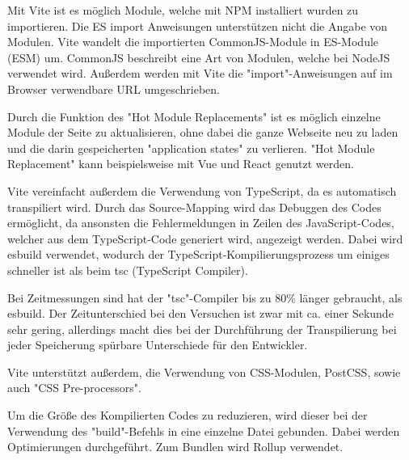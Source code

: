 

Mit Vite ist es möglich Module, welche mit NPM installiert wurden zu importieren. Die ES import Anweisungen unterstützen nicht die Angabe von Modulen. Vite wandelt die importierten CommonJS-Module in ES-Module (ESM) um. CommonJS beschreibt eine Art von Modulen, welche bei NodeJS verwendet wird. Außerdem werden mit Vite die "import"-Anweisungen auf im Browser verwendbare URL umgeschrieben. \cite{ViteFeatures}



Durch die Funktion des "Hot Module Replacements" ist es möglich einzelne Module der Seite zu aktualisieren, ohne dabei die ganze Webseite neu zu laden und die darin gespeicherten "application states" zu verlieren. "Hot Module Replacement" kann beispielsweise mit Vue und React genutzt werden. \cite{ViteFeatures}
  

Vite vereinfacht außerdem die Verwendung von TypeScript, da es automatisch transpiliert wird. 
Durch das Source-Mapping wird das Debuggen des Codes ermöglicht, da ansonsten die Fehlermeldungen in Zeilen des JavaScript-Codes, welcher aus dem TypeScript-Code generiert wird, angezeigt werden. 
Dabei wird esbuild\cite{esbuild} verwendet, wodurch der TypeScript-Kompilierungsprozess um einiges schneller ist als beim tsc (TypeScript Compiler). \cite{ViteFeatures}

Bei Zeitmessungen sind hat der "tsc"-Compiler bis zu 80\% länger gebraucht, als esbuild. Der Zeitunterschied bei den Versuchen ist zwar mit ca. einer Sekunde sehr gering, allerdings macht dies bei der Durchführung der Transpilierung bei jeder Speicherung spürbare Unterschiede für den Entwickler. 


Vite unterstützt außerdem, die Verwendung von CSS-Modulen, PostCSS, sowie auch "CSS Pre-processors". \cite{ViteFeatures}


Um die Größe des Kompilierten Codes zu reduzieren, wird dieser bei der Verwendung des "build"-Befehls in eine einzelne Datei gebunden. Dabei werden Optimierungen durchgeführt. Zum Bundlen wird Rollup \cite{Rollup} verwendet.



